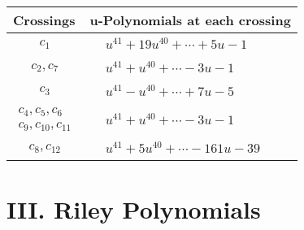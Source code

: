 \documentclass[1p]{elsarticle_modified}
\theoremstyle{definition}
\begin{document}
\begin{tabular}{m{50pt}|m{274pt}}
Crossings & \hspace{64pt}u-Polynomials at each crossing \\
\hline $$\begin{aligned}c_{1}\end{aligned}$$&$\begin{aligned}
&u^{41}+19 u^{40}+\cdots+5 u-1
\end{aligned}$\\
\hline $$\begin{aligned}c_{2},c_{7}\end{aligned}$$&$\begin{aligned}
&u^{41}+u^{40}+\cdots-3 u-1
\end{aligned}$\\
\hline $$\begin{aligned}c_{3}\end{aligned}$$&$\begin{aligned}
&u^{41}- u^{40}+\cdots+7 u-5
\end{aligned}$\\
\hline $$\begin{aligned}c_{4},c_{5},c_{6}\\c_{9},c_{10},c_{11}\end{aligned}$$&$\begin{aligned}
&u^{41}+u^{40}+\cdots-3 u-1
\end{aligned}$\\
\hline $$\begin{aligned}c_{8},c_{12}\end{aligned}$$&$\begin{aligned}
&u^{41}+5 u^{40}+\cdots-161 u-39
\end{aligned}$\\
\hline
\end{tabular}\newpage\renewcommand{\arraystretch}{1}
\centering \section*{ III. Riley Polynomials}
\end{document}
